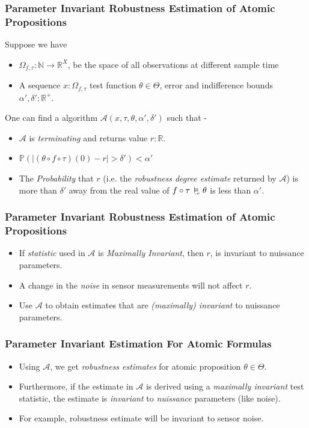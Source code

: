 \documentclass{beamer}
\newcommand{\typeReal}{\mathbb{R}}
\newcommand{\typeNat}{\mathbb{N}}
\newcommand{\typeProb}{\mathbb{P}}
\newcommand{\A}{\mathcal{A}}
\newcommand{\discrete}{\raisebox{-0.1ex}{\scalebox{0.25}{\textrm{DSC}}}}
\newcommand{\discreteSatisfy}{\ \stackMath\stackunder[0pt]{\vDash}{\hspace*{0.3em}\discrete}\ }
\begin{document}
\begin{frame}
\frametitle{Parameter Invariant Robustness Estimation of Atomic Propositions}

    Suppose we have
    \begin{itemize}
        \item $\Omega_{f, \tau}: \typeNat \to \typeReal^{X}$, be the space
        of all observations at different sample time
        \item A sequence $x: \Omega_{f, \tau}$ test function $\theta \in \Theta$,
        error and indifference bounds $\alpha', \delta' :\typeReal^{+}$.
    \end{itemize}
    \pause
    One can find a algorithm $\A(x, \tau, \theta, \alpha', \delta')$ such that -
    \begin{itemize}
        \item $\A$ is \textit{terminating} and returns value $r:\typeReal$.
        \item $\typeProb({\mid (\theta \circ f \circ \tau)(0) - r \mid > \delta'}) < \alpha'$
        \item The \textit{Probability} that $r$ (i.e. the \textit{robustness degree estimate}
            returned by $\A$) is more than $\delta'$ away from the real value of
            $f \circ \tau \discreteSatisfy \theta$ is less than $\alpha'$.
    \end{itemize}

\end{frame}

\begin{frame}

\frametitle{Parameter Invariant Robustness Estimation of Atomic Propositions}
    \begin{itemize}
        \item If \textit{statistic} used in $\A$ is \textit{Maximally
            Invariant}, then $r$, is invariant to nuissance parameters.
        \item A change in the \textit{noise} in sensor measurements
            will not affect $r$.
        \item Use $\A$ to obtain
             estimates that are \textit{(maximally) invariant}
             to nuissance parameters.
    \end{itemize}
\end{frame}

\begin{frame}

\frametitle{Parameter Invariant Estimation For Atomic Formulas}
    \begin{itemize}
        \item Using $\A$, we get \textit{robustness estimates}
            for atomic proposition $\theta \in \Theta$.
        \item Furthermore, if the estimate in $\A$ is derived
            using a \textit{maximally invariant} test statistic,
            the estimate is \textit{invariant} to \textit{nuissance}
            parameters (like noise).
        \item For example, robustness estimate will be invariant
            to sensor noise.
    \end{itemize}
\end{frame}
\end{document}
